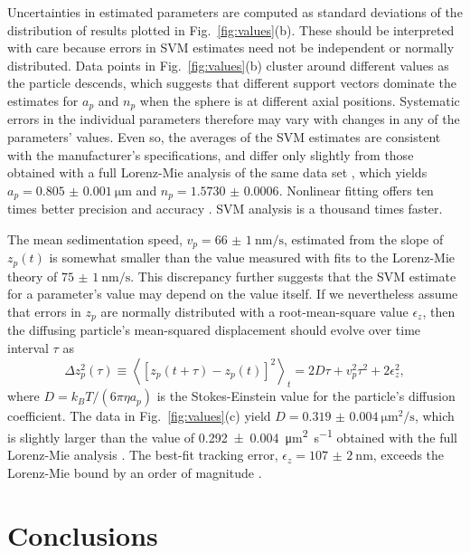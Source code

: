 \documentclass[10pt,letterpaper]{article}
\newcommand{\avg}[1]{\left< #1 \right>}
\begin{document}
Uncertainties in estimated parameters are computed as
standard deviations of the distribution of results
plotted in Fig.~\ref{fig:values}(b).
These should be interpreted with care because errors in SVM estimates
need not be independent or normally distributed.
Data points in Fig.~\ref{fig:values}(b) cluster around
different values as the particle descends,
which suggests that different support 
vectors dominate the estimates for $a_p$ and $n_p$
when the sphere is at different axial positions.
Systematic errors in the individual parameters therefore may 
vary with changes in any of the parameters' values.
Even so, the averages of the SVM estimates
are consistent with the manufacturer's specifications,
and differ only slightly from those obtained
with a full Lorenz-Mie analysis of the same data set
\cite{krishnatreya14},
which yields $a_p = \SI{0.805(1)}{\um}$ and
$n_p = \num{1.5730(6)}$.
Nonlinear fitting offers ten times better precision and
accuracy \cite{krishnatreya14}.
SVM analysis is a thousand times faster.

The mean sedimentation speed,
$v_p = \SI{66(1)}{\nm\per\second}$,
estimated from the slope of $z_p(t)$ is somewhat smaller than the value measured with
fits to the Lorenz-Mie theory
\cite{krishnatreya14} of $\SI{75(1)}{\nm\per\second}$.
This discrepancy further suggests that the SVM estimate for a
parameter's value may depend on the value itself.
If we nevertheless assume that errors in $z_p$
are normally distributed with a root-mean-square value $\epsilon_z$,
then the diffusing particle's mean-squared
displacement should evolve over time interval $\tau$ as
\begin{equation}
  \Delta z_p^2(\tau)
  \equiv
  \avg{ \left[ z_p(t + \tau) - z_p(t) \right]^2 }_t
  =
  2 D \tau + v_p^2 \tau^2 + 2 \epsilon_z^2,
  \label{eq:einsteinsmoluchowsky}
\end{equation}
where $D = k_B T / (6 \pi \eta a_p)$ is the Stokes-Einstein
value for the particle's diffusion coefficient.
The data in Fig.~\ref{fig:values}(c) yield
$D = \SI{0.319(4)}{\um\squared\per\second}$, which
is slightly larger than the value of
\SI{0.292(4)}{\um\squared\per\second}
obtained with the full Lorenz-Mie analysis \cite{krishnatreya14}.
The best-fit tracking error,
$\epsilon_z = \SI{107(2)}{\nm}$, exceeds the Lorenz-Mie
bound by an order of magnitude
\cite{krishnatreya14}.

\section{Conclusions}
\end{document}
